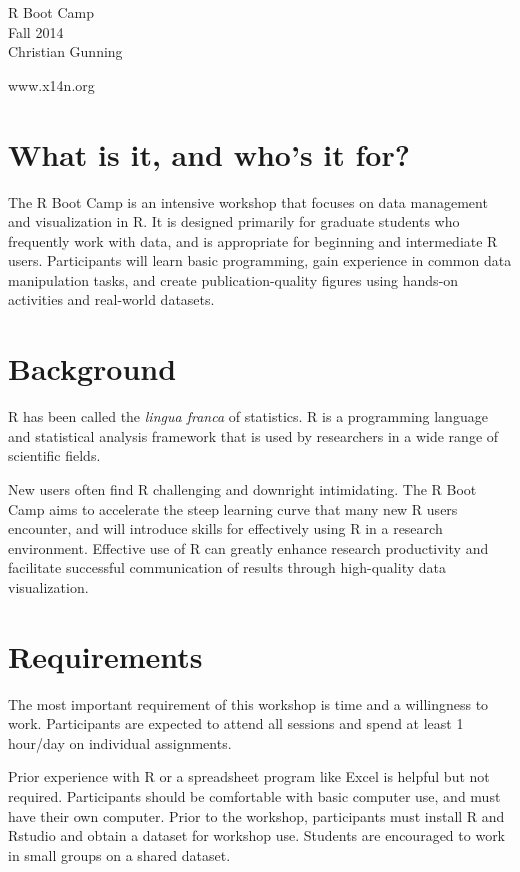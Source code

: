 \documentclass[english, letterpaper, 12pt]{article}
\begin{document}
\begin{center}
\Large{R Boot Camp}
~\\
\large{Fall 2014}
~\\
\large{Christian Gunning}

www.x14n.org
~\\
\end{center}
 
\section*{What is it, and who's it for?}
The R Boot Camp is an intensive workshop that focuses on data management and
visualization in R.   It is designed primarily for graduate students who
frequently work with data, and is appropriate
for beginning and intermediate R users.   Participants will 
learn basic programming, gain experience in common data manipulation
tasks, and create publication-quality figures using hands-on activities and 
real-world datasets.

\section*{Background}
R has been called the {\em lingua franca} of statistics. R is a
programming language 
and statistical analysis framework that is used by
researchers in a wide range of scientific fields.

New users often find R
challenging and downright intimidating. 
The R Boot Camp aims to accelerate the steep learning curve 
that many new R users encounter, and will introduce 
skills for effectively using R in a research environment.
Effective use of R can greatly enhance
research productivity and facilitate successful communication of results
through high-quality data visualization. 

\section*{Requirements}
The most important requirement of this workshop is time and a willingness to
work.  Participants are expected to attend all sessions and spend at least 1 hour/day
on individual assignments.

Prior experience with R or a spreadsheet program like Excel is helpful but not
required.  Participants should be comfortable with basic
computer use, and must have their own computer.  Prior to the workshop, participants
must install R and Rstudio and obtain a dataset for workshop use.
Students are encouraged to work in small groups on a shared dataset.
\end{document}
